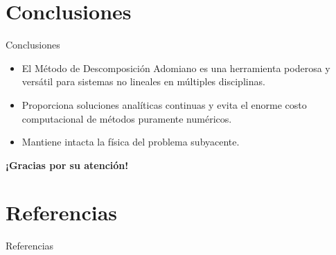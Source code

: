 \documentclass[
    8pt,
    aspectratio=1610,
    c,
    spanish,
    handout,
    intlimits,
    leqno,
    professionalfonts,
    spanish,
    xcolor=svgnames,
]{beamer}
\begin{document}

\section{Conclusiones}
\begin{frame}{Conclusiones}
	\begin{itemize}
		\item El Método de Descomposición Adomiano es una herramienta poderosa y versátil para sistemas no lineales en múltiples disciplinas.
		\item Proporciona soluciones analíticas continuas y evita el enorme costo computacional de métodos puramente numéricos.
		\item Mantiene intacta la física del problema subyacente.
	\end{itemize}

	\vspace{1cm}
	\begin{center}
		\Large \textbf{¡Gracias por su atención!}
	\end{center}
\end{frame}

\section{Referencias}
\begin{frame}[allowframebreaks]{Referencias}
	\printbibliography
\end{frame}
\end{document}
